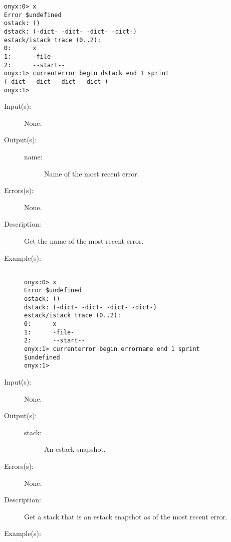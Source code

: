 \begin{description}
\begin{description}
\begin{verbatim}
onyx:0> x
Error $undefined
ostack: ()
dstack: (-dict- -dict- -dict- -dict-)
estack/istack trace (0..2):
0:      x
1:      -file-
2:      --start--
onyx:1> currenterror begin dstack end 1 sprint
(-dict- -dict- -dict- -dict-)
onyx:1>
		\end{verbatim}
	\end{description}
\label{currenterror:errorname}
\item[{\onyxop{--}{errorname}{name}}: ]
	\begin{description}\item[]
	\item[Input(s): ] None.
	\item[Output(s): ]
		\begin{description}\item[]
		\item[name: ]
			Name of the most recent error.
		\end{description}
	\item[Errors(s): ] None.
	\item[Description: ]
		Get the name of the most recent error.
	\item[Example(s): ]\begin{verbatim}

onyx:0> x
Error $undefined
ostack: ()
dstack: (-dict- -dict- -dict- -dict-)
estack/istack trace (0..2):
0:      x
1:      -file-
2:      --start--
onyx:1> currenterror begin errorname end 1 sprint
$undefined
onyx:1>
		\end{verbatim}
	\end{description}
\label{currenterror:estack}
\item[{\onyxop{--}{estack}{stack}}: ]
	\begin{description}\item[]
	\item[Input(s): ] None.
	\item[Output(s): ]
		\begin{description}\item[]
		\item[stack: ]
			An estack snapshot.
		\end{description}
	\item[Errors(s): ] None.
	\item[Description: ]
		Get a stack that is an estack snapshot as of the most recent
		error.
	\item[Example(s): ]\begin{verbatim}


\end{verbatim}
\end{description}
\end{description}
